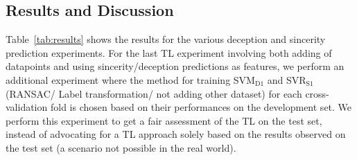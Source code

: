 \documentclass{article}
\begin{document}
\begin{spacing}{0.89}



\vspace{-3mm}
\section{Results and Discussion}
\vspace{-3mm}
Table~\ref{tab:results} shows the results for the various deception and sincerity prediction experiments. 
For the last TL experiment involving both adding of datapoints and using sincerity/deception predictions as features, we perform an additional experiment where the method for training SVM$_\text{D1}$ and SVR$_\text{S1}$ (RANSAC/ Label transformation/ not adding other dataset) for each cross-validation fold is chosen based on their performances on the development set. 
We perform this experiment to get a fair assessment of the TL on the test set, instead of advocating for a TL approach solely based on the results observed on the test set (a scenario not possible in the real world).


\end{spacing}
\end{document}
